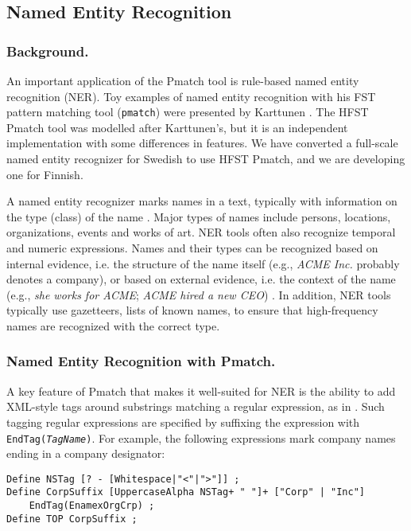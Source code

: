 \documentclass{llncs}
\begin{document}
\subsection{Named Entity Recognition}

\subsubsection{Background.}

An important application of the Pmatch tool is rule-based named entity
recognition (NER). Toy examples of named entity recognition with
his FST pattern matching tool (\texttt{pmatch}) were presented by Karttunen
\cite{karttunen/2011}. The HFST Pmatch tool was modelled after
Karttunen's, but it is an independent implementation with
some differences in features. We have
converted a full-scale named entity recognizer for Swedish to use
HFST Pmatch, and we are developing one for Finnish.

A named entity recognizer marks names in a text, typically with
information on the type (class) of the name \cite{nadeau/2007}. Major
types of names include persons, locations, organizations, events and
works of art. NER tools often also recognize temporal and numeric
expressions. Names and their types can be recognized based on internal
evidence, i.e. the structure of the name itself (e.g., \textit{ACME
  Inc.} probably denotes a company), or based on external evidence,
i.e. the context of the name (e.g., \textit{she works for ACME};
\textit{ACME hired a new CEO}) \cite{mcdonald/1996}. In
addition, NER tools typically use gazetteers, lists of known names, to
ensure that high-frequency names are recognized with the correct type.

\subsubsection{Named Entity Recognition with Pmatch.}
\label{pmatch_for_ner}

A key feature of Pmatch that makes it well-suited for NER is the ability
to add XML-style tags around substrings matching a regular expression,
as in \cite{karttunen/2011}. Such tagging regular expressions are
specified by suffixing the expression with
\texttt{EndTag(\textit{TagName})}. For example, the following
expressions mark company names ending in a company designator:

\begin{verbatim}
Define NSTag [? - [Whitespace|"<"|">"]] ;
Define CorpSuffix [UppercaseAlpha NSTag+ " "]+ ["Corp" | "Inc"]
    EndTag(EnamexOrgCrp) ;
Define TOP CorpSuffix ;
\end{verbatim}
\end{document}
